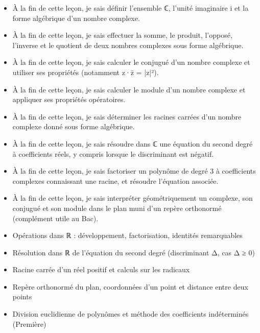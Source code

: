 \documentclass[11pt]{article}
\begin{document}
\begin{objectifs}
\begin{itemize}
\item À la fin de cette leçon, je sais définir l'ensemble ℂ, l'unité imaginaire i et la forme algébrique d'un nombre complexe.
\item À la fin de cette leçon, je sais effectuer la somme, le produit, l'opposé, l'inverse et le quotient de deux nombres complexes sous forme algébrique.
\item À la fin de cette leçon, je sais calculer le conjugué d'un nombre complexe et utiliser ses propriétés (notamment z·z̄ = |z|²).
\item À la fin de cette leçon, je sais calculer le module d'un nombre complexe et appliquer ses propriétés opératoires.
\item À la fin de cette leçon, je sais déterminer les racines carrées d'un nombre complexe donné sous forme algébrique.
\item À la fin de cette leçon, je sais résoudre dans ℂ une équation du second degré à coefficients réels, y compris lorsque le discriminant est négatif.
\item À la fin de cette leçon, je sais factoriser un polynôme de degré 3 à coefficients complexes connaissant une racine, et résoudre l'équation associée.
\item À la fin de cette leçon, je sais interpréter géométriquement un complexe, son conjugué et son module dans le plan muni d'un repère orthonormé (complément utile au Bac).
\end{itemize}
\end{objectifs}

\begin{prerequis}
\begin{itemize}
\item Opérations dans ℝ : développement, factorisation, identités remarquables
\item Résolution dans ℝ de l'équation du second degré (discriminant Δ, cas Δ ≥ 0)
\item Racine carrée d'un réel positif et calculs sur les radicaux
\item Repère orthonormé du plan, coordonnées d'un point et distance entre deux points
\item Division euclidienne de polynômes et méthode des coefficients indéterminés (Première)
\end{itemize}
\end{prerequis}

\newpage
\end{document}

